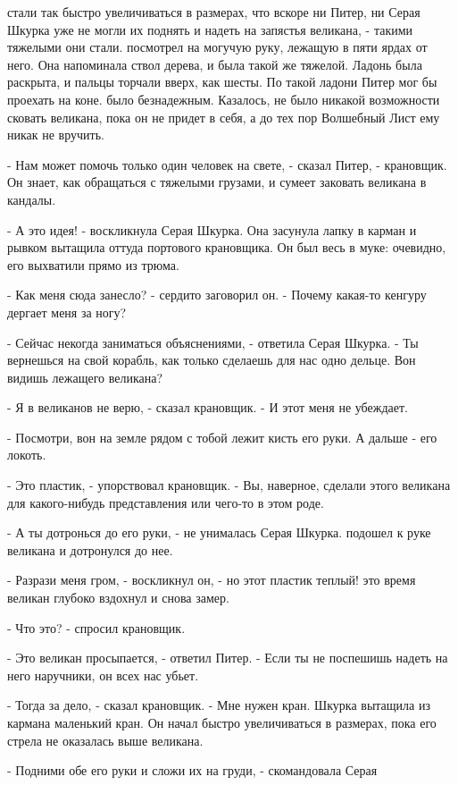 стали так быстро увеличиваться в размерах, что вскоре ни Питер, ни 
Серая Шкурка уже не могли их поднять и надеть на запястья великана, - 
такими тяжелыми они стали.
 посмотрел на могучую руку, лежащую в пяти ярдах от него. Она 
напоминала ствол дерева, и была такой же тяжелой. Ладонь была 
раскрыта, и пальцы торчали вверх, как шесты. По такой ладони Питер мог 
бы проехать на коне.
 было безнадежным. Казалось, не было никакой возможности 
сковать великана, пока он не придет в себя, а до тех пор Волшебный 
Лист ему никак не вручить.
\par- Нам может помочь только один человек на свете, - сказал Питер, - 
крановщик. Он знает, как обращаться с тяжелыми грузами, и сумеет 
заковать великана в кандалы.
\par- А это идея! - воскликнула Серая Шкурка. Она засунула лапку в 
карман и рывком вытащила оттуда портового крановщика. Он был весь в 
муке: очевидно, его выхватили прямо из трюма.
\par- Как меня сюда занесло? - сердито заговорил он. - Почему какая-то 
кенгуру дергает меня за ногу?
\par- Сейчас некогда заниматься объяснениями, - ответила Серая Шкурка. 
- Ты вернешься на свой корабль, как только сделаешь для нас одно 
дельце. Вон видишь лежащего великана?
\par- Я в великанов не верю, - сказал крановщик. - И этот меня не 
убеждает.
\par- Посмотри, вон на земле рядом с тобой лежит кисть его руки. А 
дальше - его локоть.
\par- Это пластик, - упорствовал крановщик. - Вы, наверное, сделали 
этого великана для какого-нибудь представления или чего-то в этом 
роде.
\par- А ты дотронься до его руки, - не унималась Серая Шкурка.
 подошел к руке великана и дотронулся до нее.
\par- Разрази меня гром, - воскликнул он, - но этот пластик теплый!
 это время великан глубоко вздохнул и снова замер.
\par- Что это? - спросил крановщик.
\par- Это великан просыпается, - ответил Питер. - Если ты не поспешишь 
надеть на него наручники, он всех нас убьет.
\par- Тогда за дело, - сказал крановщик. - Мне нужен кран.
 Шкурка вытащила из кармана маленький кран. Он начал быстро 
увеличиваться в размерах, пока его стрела не оказалась выше великана.
\par- Подними обе его руки и сложи их на груди, - скомандовала Серая 
